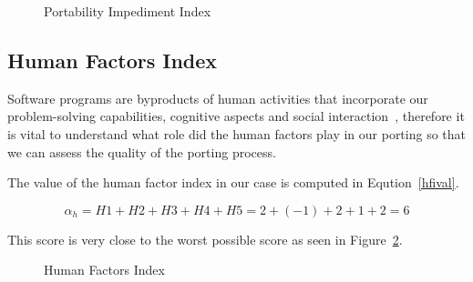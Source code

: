 \begin{figure}
    \begin{center}
    \end{center}

    \caption{Portability Impediment Index}
    \label{fig:pii}
\end{figure}


\subsection{Human Factors Index}

Software programs are byproducts of human activities that incorporate our
problem-solving capabilities, cognitive aspects and social
interaction~\cite{capretz}, therefore it is vital to understand what role did the
human factors play in our porting so that we can assess the quality of the
porting process. 

The value of the human factor index in our case is computed in
Eqution~\ref{hfival}.

\begin{equation} \label{eq:hfival}
\alpha_h = H1 + H2 + H3 + H4 + H5 = 2 + (-1) + 2 + 1 + 2 = 6
\end{equation}

This score is very close to the worst possible score as seen in
Figure~\ref{fig:hfi}.

\begin{figure}
    \begin{center}
    \end{center}

    \caption{Human Factors Index}
    \label{fig:hfi}
\end{figure}

